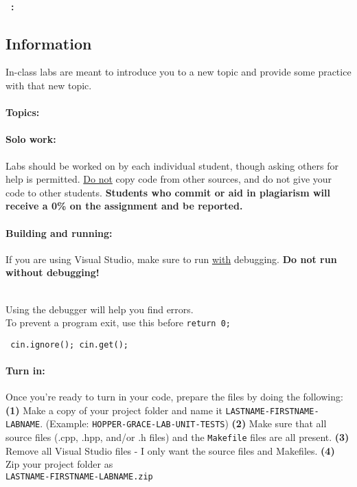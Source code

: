 ~\\ \textbf{\laType\ \laAssignment: \laTitle \tab }

\normalsize 

    \subsection*{Information}
    
        In-class labs are meant to introduce you to a new topic and provide
        some practice with that new topic. 
    
        \paragraph{Topics:} \laTopics
        
        \paragraph{Solo work:}
        Labs should be worked on by each
        individual student, though asking others for help is permitted.
        \underline{Do not} copy code from other sources, and do not give your
        code to other students.
        \textbf{ \color{red} Students who commit or aid in plagiarism will receive a 0\% on the assignment and be reported. }

        \paragraph{Building and running:} If you are using Visual Studio,
            make sure to run \underline{with} debugging.
            \textbf{ \color{red} Do not run without debugging! }

            ~\\
            Using the debugger will help you find errors. \\
            To prevent a program exit, use this before \texttt{return 0;}

            \begin{mdframed} \centering
                \texttt{ cin.ignore(); \tab cin.get(); }
            \end{mdframed}

        \paragraph{Turn in:}
            Once you're ready to turn in your code, prepare the files by
            doing the following: \textbf{(1)} Make a copy of your project folder and name it \texttt{LASTNAME-FIRSTNAME-LABNAME}.
            (Example: \texttt{HOPPER-GRACE-LAB-UNIT-TESTS})
            \textbf{(2)} Make sure that all source files (.cpp, .hpp, and/or .h files) and the \texttt{Makefile} files
            are all present.
            \textbf{(3)} Remove all Visual Studio files - I only want the source files and Makefiles.
            \textbf{(4)} Zip your project folder as \\ \texttt{LASTNAME-FIRSTNAME-LABNAME.zip}
            
